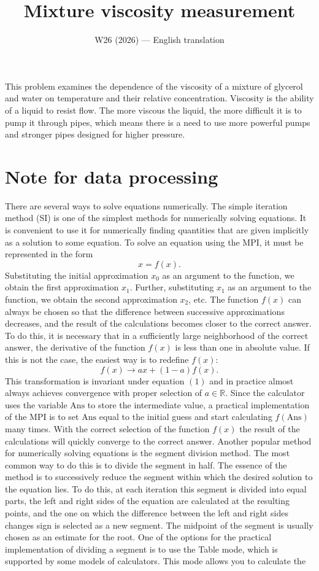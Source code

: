 \documentclass[11pt,a4paper]{article}
\title{\textbf{Mixture viscosity measurement}}
\author{\normalsize W26 (2026) --- English translation}
\date{}
\begin{document}
\maketitle

This problem examines the dependence of the viscosity of a mixture of glycerol and water on temperature and their relative concentration. Viscosity is the ability of a liquid to resist flow. The more viscous the liquid, the more difficult it is to pump it through pipes, which means there is a need to use more powerful pumps and stronger pipes designed for higher pressure.

\section*{Note for data processing}

There are several ways to solve equations numerically. The simple iteration method (SI) is one of the simplest methods for numerically solving equations. It is convenient to use it for numerically finding quantities that are given implicitly as a solution to some equation. To solve an equation using the MPI, it must be represented in the form \begin{equation}x=f(x).\tag{1}\end{equation}Substituting the initial approximation $x_0$ as an argument to the function, we obtain the first approximation $x_1$. Further, substituting $x_1$ as an argument to the function, we obtain the second approximation $x_2$, etc. The function $f(x)$ can always be chosen so that the difference between successive approximations decreases, and the result of the calculations becomes closer to the correct answer. To do this, it is necessary that in a sufficiently large neighborhood of the correct answer, the derivative of the function $f(x)$ is less than one in absolute value. If this is not the case, the easiest way is to redefine $f(x)$:\[f(x)\to ax+(1-a)f(x).\] This transformation is invariant under equation $(1)$ and in practice almost always achieves convergence with proper selection of $a\in \mathbb R$. Since the calculator uses the variable $\mathrm{Ans}$ to store the intermediate value, a practical implementation of the MPI is to set $\mathrm{Ans}$ equal to the initial guess and start calculating $f(\mathrm{Ans})$ many times. With the correct selection of the function $f(x)$ the result of the calculations will quickly converge to the correct answer. Another popular method for numerically solving equations is the segment division method. The most common way to do this is to divide the segment in half. The essence of the method is to successively reduce the segment within which the desired solution to the equation lies. To do this, at each iteration this segment is divided into equal parts, the left and right sides of the equation are calculated at the resulting points, and the one on which the difference between the left and right sides changes sign is selected as a new segment. The midpoint of the segment is usually chosen as an estimate for the root. One of the options for the practical implementation of dividing a segment is to use the Table mode, which is supported by some models of calculators. This mode allows you to calculate the 
\end{document}
